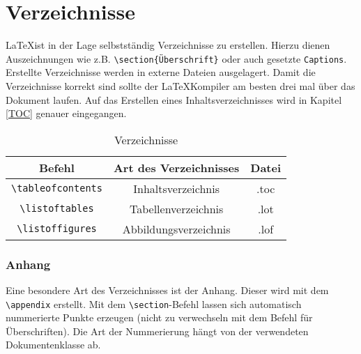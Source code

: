 \chapter{Verzeichnisse}
\LaTeX ist in der Lage selbstständig Verzeichnisse zu erstellen. Hierzu dienen Auszeichnungen wie z.B. \verb=\section{Überschrift}= oder auch gesetzte \texttt{Captions}. Erstellte Verzeichnisse werden in externe Dateien ausgelagert. Damit die Verzeichnisse korrekt sind sollte der \LaTeX Kompiler am besten drei mal über das Dokument laufen. Auf das Erstellen eines Inhaltsverzeichnisses wird in Kapitel \ref{TOC} genauer eingegangen.
\begin{table}[H]
\centering
\begin{tabular}{|c|c|c|}
\hline
Befehl					&Art des Verzeichnisses	&Datei\\
\hline
\verb=\tableofcontents=         	&Inhaltsverzeichnis		&.toc\\
\hline
\verb=\listoftables=			&Tabellenverzeichnis		&.lot\\
\hline
\verb=\listoffigures=			&Abbildungsverzeichnis	&.lof\\
\hline
\end{tabular}
\caption{Verzeichnisse}
\end{table}
\subsection{Anhang}
Eine besondere Art des Verzeichnisses ist der Anhang. Dieser wird mit dem \verb=\appendix= erstellt. Mit dem \verb=\section=-Befehl lassen sich automatisch nummerierte Punkte erzeugen (nicht zu verwechseln mit dem Befehl für Überschriften). Die Art der Nummerierung hängt von der verwendeten Dokumentenklasse ab.